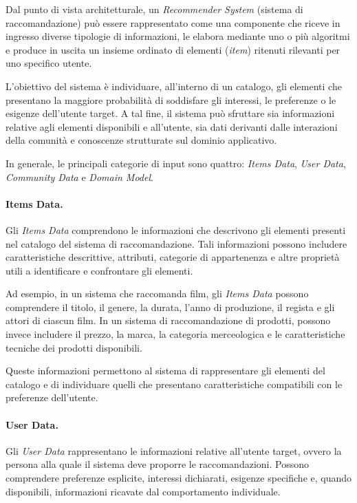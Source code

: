 Dal punto di vista architetturale, un \textit{Recommender System} (sistema
di raccomandazione) può essere rappresentato come una componente che riceve
in ingresso diverse tipologie di informazioni, le elabora mediante uno o
più algoritmi e produce in uscita un insieme ordinato di elementi
(\textit{item}) ritenuti rilevanti per uno specifico utente.

L'obiettivo del sistema è individuare, all'interno di un catalogo, gli
elementi che presentano la maggiore probabilità di soddisfare gli
interessi, le preferenze o le esigenze dell'utente target. A tal fine,
il sistema può sfruttare sia informazioni relative agli elementi
disponibili e all'utente, sia dati derivanti dalle interazioni della
comunità e conoscenze strutturate sul dominio applicativo.

In generale, le principali categorie di input sono quattro:
\textit{Items Data}, \textit{User Data}, \textit{Community Data} e
\textit{Domain Model}.

\paragraph{Items Data.}
Gli \textit{Items Data} comprendono le informazioni che descrivono gli
elementi presenti nel catalogo del sistema di raccomandazione. Tali
informazioni possono includere caratteristiche descrittive, attributi,
categorie di appartenenza e altre proprietà utili a identificare e
confrontare gli elementi.

Ad esempio, in un sistema che raccomanda film, gli \textit{Items Data}
possono comprendere il titolo, il genere, la durata, l'anno di
produzione, il regista e gli attori di ciascun film. In un sistema
di raccomandazione di prodotti, possono invece includere il prezzo,
la marca, la categoria merceologica e le caratteristiche tecniche
dei prodotti disponibili.

Queste informazioni permettono al sistema di rappresentare gli
elementi del catalogo e di individuare quelli che presentano
caratteristiche compatibili con le preferenze dell'utente.

\paragraph{User Data.}
Gli \textit{User Data} rappresentano le informazioni relative
all'utente target, ovvero la persona alla quale il sistema deve
proporre le raccomandazioni. Possono comprendere preferenze esplicite,
interessi dichiarati, esigenze specifiche e, quando disponibili,
informazioni ricavate dal comportamento individuale.


